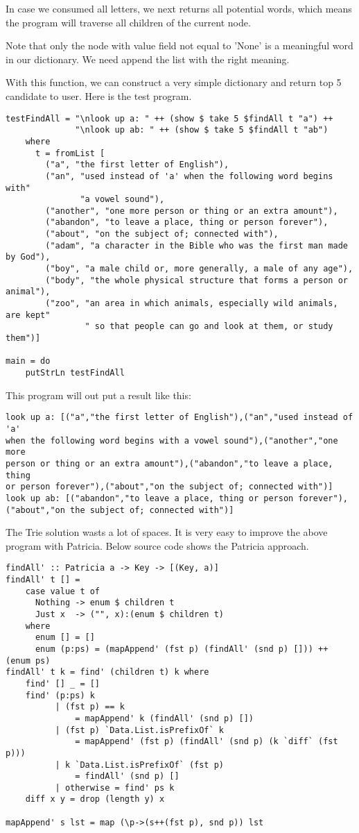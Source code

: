 \documentclass{article}
\begin{document}
In case we consumed all letters, we next returns all potential words, which
means the program will traverse all children of the current node.

Note that only the node with value field not equal to 'None' is a meaningful
word in our dictionary. We need append the list with the right meaning.

With this function, we can construct a very simple dictionary and return
top 5 candidate to user. Here is the test program.

\begin{lstlisting}
testFindAll = "\nlook up a: " ++ (show $ take 5 $findAll t "a") ++
              "\nlook up ab: " ++ (show $ take 5 $findAll t "ab")
    where
      t = fromList [
        ("a", "the first letter of English"),
        ("an", "used instead of 'a' when the following word begins with"
               "a vowel sound"),
        ("another", "one more person or thing or an extra amount"),
        ("abandon", "to leave a place, thing or person forever"),
        ("about", "on the subject of; connected with"),
        ("adam", "a character in the Bible who was the first man made by God"),
        ("boy", "a male child or, more generally, a male of any age"),
        ("body", "the whole physical structure that forms a person or animal"),
        ("zoo", "an area in which animals, especially wild animals, are kept"
                " so that people can go and look at them, or study them")]

main = do
    putStrLn testFindAll
\end{lstlisting}

This program will out put a result like this:
\begin{verbatim}
look up a: [("a","the first letter of English"),("an","used instead of 'a'
when the following word begins with a vowel sound"),("another","one more
person or thing or an extra amount"),("abandon","to leave a place, thing
or person forever"),("about","on the subject of; connected with")]
look up ab: [("abandon","to leave a place, thing or person forever"),
("about","on the subject of; connected with")]
\end{verbatim}

The Trie solution wasts a lot of spaces. It is very easy to improve the above
program with Patricia. Below source code shows the Patricia approach.

\begin{lstlisting}
findAll' :: Patricia a -> Key -> [(Key, a)]
findAll' t [] =
    case value t of
      Nothing -> enum $ children t
      Just x  -> ("", x):(enum $ children t)
    where
      enum [] = []
      enum (p:ps) = (mapAppend' (fst p) (findAll' (snd p) [])) ++ (enum ps)
findAll' t k = find' (children t) k where
    find' [] _ = []
    find' (p:ps) k
          | (fst p) == k
              = mapAppend' k (findAll' (snd p) [])
          | (fst p) `Data.List.isPrefixOf` k
              = mapAppend' (fst p) (findAll' (snd p) (k `diff` (fst p)))
          | k `Data.List.isPrefixOf` (fst p)
              = findAll' (snd p) []
          | otherwise = find' ps k
    diff x y = drop (length y) x

mapAppend' s lst = map (\p->(s++(fst p), snd p)) lst
\end{lstlisting}
\end{document}
